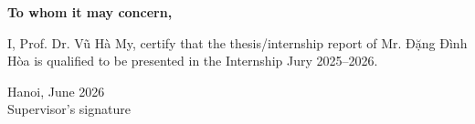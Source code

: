 \thispagestyle{empty}

\vspace*{2cm}

\begin{center}
\textbf{To whom it may concern,}
\end{center}

\noindent
I, Prof. Dr. Vũ Hà My, certify that the thesis/internship report of
Mr. Đặng Đình Hòa is qualified to be presented in the Internship Jury
2025--2026.

\vspace{2cm}

\begin{flushright}
Hanoi, June 2026\\
Supervisor's signature
\end{flushright}
\clearpage

